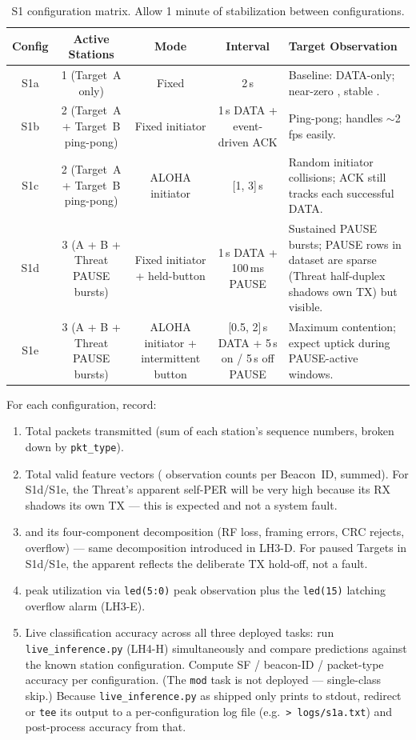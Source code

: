 \documentclass[11pt,letterpaper]{article}
\begin{document}
\begin{table}[h!]
	\centering
	\renewcommand{\arraystretch}{1.3}
	\begin{tabularx}{\textwidth}{c c c c X}
		\toprule
		\textbf{Config} & \textbf{Active Stations} & \textbf{Mode} & \textbf{Interval} & \textbf{Target Observation} \\
		\midrule
		S1a & 1 (Target~A only)             & Fixed                          & 2\,s                       & Baseline: DATA-only; near-zero \PER{}, stable \FIFO{}. \\
		S1b & 2 (Target~A + Target~B ping-pong) & Fixed initiator                & 1\,s DATA + event-driven ACK & Ping-pong; \FIFO{} handles $\sim$2\,fps easily. \\
		S1c & 2 (Target~A + Target~B ping-pong) & ALOHA initiator                & [1, 3]\,s                  & Random initiator collisions; ACK still tracks each successful DATA. \\
		S1d & 3 (A + B + Threat PAUSE bursts) & Fixed initiator + held-button & 1\,s DATA + 100\,ms PAUSE   & Sustained PAUSE bursts; PAUSE rows in dataset are sparse (Threat half-duplex shadows own TX) but visible. \\
		S1e & 3 (A + B + Threat PAUSE bursts) & ALOHA initiator + intermittent button & [0.5, 2]\,s DATA + 5\,s on / 5\,s off PAUSE & Maximum contention; expect \PER{} uptick during PAUSE-active windows. \\
		\bottomrule
	\end{tabularx}
	\caption{S1 configuration matrix. Allow 1 minute of stabilization between configurations.}
\end{table}

For each configuration, record:
\begin{enumerate}[leftmargin=2em]
	\item Total packets transmitted (sum of each station's sequence numbers, broken down by \texttt{pkt\_type}).
	\item Total valid feature vectors (\FPGA{} observation counts per Beacon~\mbox{ID}, summed). For S1d/S1e, the Threat's apparent self-PER will be very high because its RX shadows its own TX --- this is expected and not a system fault.
	\item \PER{} and its four-component decomposition (\mbox{RF} loss, framing errors, \mbox{CRC} rejects, \FIFO{} overflow) --- same decomposition introduced in LH3-D. For paused Targets in S1d/S1e, the apparent \PER{} reflects the deliberate TX hold-off, not a fault.
	\item \FIFO{} peak utilization via \texttt{led(5:0)} peak observation plus the \texttt{led(15)} latching overflow alarm (LH3-E).
	\item Live classification accuracy across all three deployed tasks: run \texttt{live\_inference.py} (LH4-H) simultaneously and compare predictions against the known station configuration. Compute SF / beacon-ID / packet-type accuracy per configuration. (The \texttt{mod} task is not deployed --- single-class skip.) Because \texttt{live\_inference.py} as shipped only prints to stdout, redirect or \texttt{tee} its output to a per-configuration log file (e.g.\ \texttt{> logs/s1a.txt}) and post-process accuracy from that.
\end{enumerate}
\end{document}
